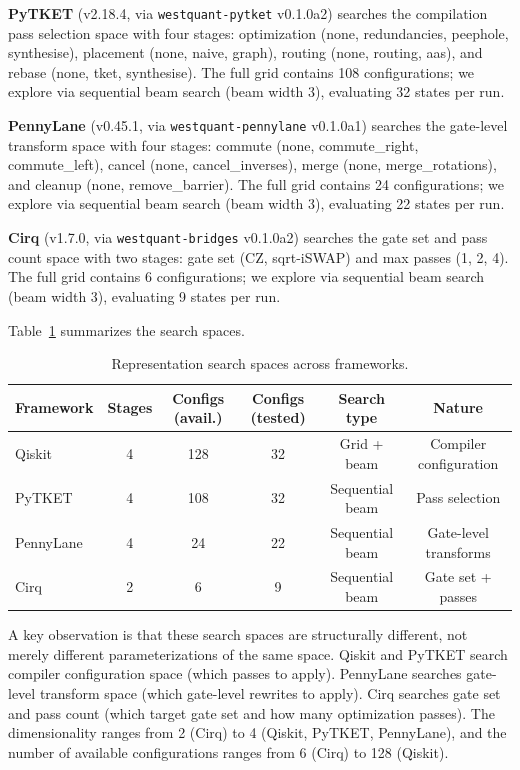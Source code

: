 \documentclass[11pt,a4paper]{article}
\begin{document}
\textbf{PyTKET} (v2.18.4, via \texttt{westquant-pytket} v0.1.0a2) searches the compilation pass selection space with four stages: optimization (none, redundancies, peephole, synthesise), placement (none, naive, graph), routing (none, routing, aas), and rebase (none, tket, synthesise). The full grid contains 108 configurations; we explore via sequential beam search (beam width 3), evaluating 32 states per run.

\textbf{PennyLane} (v0.45.1, via \texttt{westquant-pennylane} v0.1.0a1) searches the gate-level transform space with four stages: commute (none, commute\_right, commute\_left), cancel (none, cancel\_inverses), merge (none, merge\_rotations), and cleanup (none, remove\_barrier). The full grid contains 24 configurations; we explore via sequential beam search (beam width 3), evaluating 22 states per run.

\textbf{Cirq} (v1.7.0, via \texttt{westquant-bridges} v0.1.0a2) searches the gate set and pass count space with two stages: gate set (CZ, sqrt-iSWAP) and max passes (1, 2, 4). The full grid contains 6 configurations; we explore via sequential beam search (beam width 3), evaluating 9 states per run.

Table~\ref{tab:search_spaces} summarizes the search spaces.

\begin{table}[H]
\centering
\caption{Representation search spaces across frameworks.}
\label{tab:search_spaces}
\begin{tabular}{lccccc}
\toprule
Framework & Stages & Configs (avail.) & Configs (tested) & Search type & Nature \\
\midrule
Qiskit & 4 & 128 & 32 & Grid + beam & Compiler configuration \\
PyTKET & 4 & 108 & 32 & Sequential beam & Pass selection \\
PennyLane & 4 & 24 & 22 & Sequential beam & Gate-level transforms \\
Cirq & 2 & 6 & 9 & Sequential beam & Gate set + passes \\
\bottomrule
\end{tabular}
\end{table}

A key observation is that these search spaces are structurally different, not merely different parameterizations of the same space. Qiskit and PyTKET search compiler configuration space (which passes to apply). PennyLane searches gate-level transform space (which gate-level rewrites to apply). Cirq searches gate set and pass count (which target gate set and how many optimization passes). The dimensionality ranges from 2 (Cirq) to 4 (Qiskit, PyTKET, PennyLane), and the number of available configurations ranges from 6 (Cirq) to 128 (Qiskit).
\end{document}
